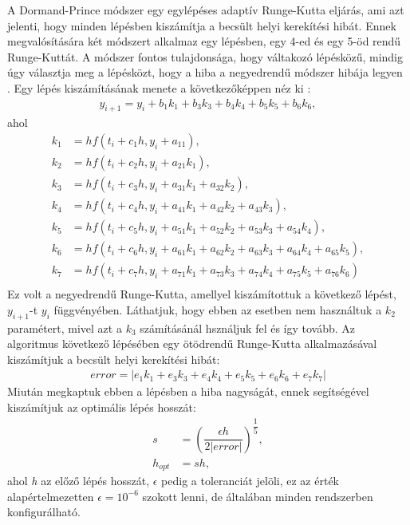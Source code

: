 A Dormand-Prince módszer egy egylépéses adaptív Runge-Kutta eljárás, ami azt jelenti, hogy minden lépésben kiszámítja a becsült helyi kerekítési hibát. Ennek megvalósítására két módszert alkalmaz egy lépésben, egy 4-ed és egy 5-öd rendű Runge-Kuttát. A módszer fontos tulajdonsága, hogy váltakozó lépésközű, mindig úgy választja meg a lépésközt, hogy a hiba a negyedrendű módszer hibája legyen \cite{RungeKuttaFormula}. \newline \newline
Egy lépés kiszámításának menete a következőképpen néz ki \cite{DoPri45}:
\begin{align}
	y_{i+1} = y_{i} + b_{1}k_{1} + b_{3}k_{3} + b_{4}k_{4} + b_{5}k_{5} + b_{6}k_{6},
\end{align}
ahol
\begin{align*}
	k_{1} &= hf(t_{i}+c_{1}h,y_{i}+a_{11}), \\
	k_{2} &= hf(t_{i}+c_{2}h,y_{i}+a_{21}k_{1}), \\
	k_{3} &= hf(t_{i}+c_{3}h,y_{i}+a_{31}k_{1}+a_{32}k_{2}), \\
	k_{4} &= hf(t_{i}+c_{4}h,y_{i}+a_{41}k_{1}+a_{42}k_{2}+a_{43}k_{3}), \\
	k_{5} &= hf(t_{i}+c_{5}h,y_{i}+a_{51}k_{1}+a_{52}k_{2}+a_{53}k_{3}+a_{54}k_{4}), \\
	k_{6} &= hf(t_{i}+c_{6}h,y_{i}+a_{61}k_{1}+a_{62}k_{2}+a_{63}k_{3}+a_{64}k_{4}+a_{65}k_{5}), \\
	k_{7} &= hf(t_{i}+c_{7}h,y_{i}+a_{71}k_{1}+a_{73}k_{3}+a_{74}k_{4}+a_{75}k_{5}+a_{76}k_{6}) \\
\end{align*}
Ez volt a negyedrendű Runge-Kutta, amellyel kiszámítottuk a következő lépést, $ y_{i+1} $-t $ y_{i} $ függvényében. Láthatjuk, hogy ebben az esetben nem használtuk a $ k_{2} $ paramétert, mivel azt a $ k_{3} $ számításánál hsználjuk fel és így tovább. Az algoritmus következő lépésében egy ötödrendű Runge-Kutta alkalmazásával kiszámítjuk a becsült helyi kerekítési hibát:
\begin{align}
	error = \left|e_{1}k_{1} + e_{3}k_{3} + e_{4}k_{4} + e_{5}k_{5} + e_{6}k_{6} + e_{7}k_{7}\right|
\end{align}
Miután megkaptuk ebben a lépésben a hiba nagyságát, ennek segítségével kiszámítjuk az optimális lépés hosszát:
\begin{align*}
	s &= \left( \dfrac{\epsilon h}{2|error|} \right)^ {\dfrac{1}{5}}, \\
	h_{opt} &= sh,
\end{align*}
ahol \textit{h} az előző lépés hosszát, $\epsilon$ pedig a toleranciát jelöli, ez az érték alapértelmezetten $ \epsilon = 10^{-6} $ szokott lenni, de általában minden rendszerben konfigurálható.

